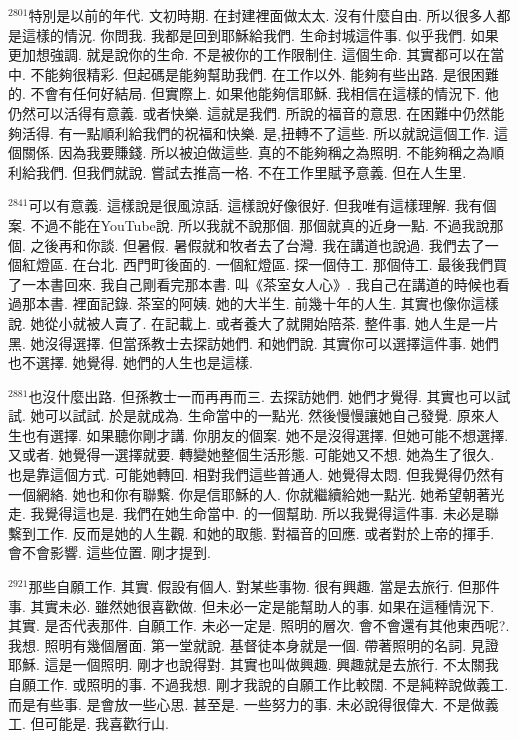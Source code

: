 \documentclass{book}
\begin{document}
$^{2801}$特別是以前的年代.
文初時期.
在封建裡面做太太.
沒有什麼自由.
所以很多人都是這樣的情況.
你問我.
我都是回到耶穌給我們.
生命封城這件事.
似乎我們.
如果更加想強調.
就是說你的生命.
不是被你的工作限制住.
這個生命.
其實都可以在當中.
不能夠很精彩.
但起碼是能夠幫助我們.
在工作以外.
能夠有些出路.
是很困難的.
不會有任何好結局.
但實際上.
如果他能夠信耶穌.
我相信在這樣的情況下.
他仍然可以活得有意義.
或者快樂.
這就是我們.
所說的福音的意思.
在困難中仍然能夠活得.
有一點順利給我們的祝福和快樂.
是,扭轉不了這些.
所以就說這個工作.
這個關係.
因為我要賺錢.
所以被迫做這些.
真的不能夠稱之為照明.
不能夠稱之為順利給我們.
但我們就說.
嘗試去推高一格.
不在工作里賦予意義.
但在人生里.

$^{2841}$可以有意義.
這樣說是很風涼話.
這樣說好像很好.
但我唯有這樣理解.
我有個案.
不過不能在YouTube說.
所以我就不說那個.
那個就真的近身一點.
不過我說那個.
之後再和你談.
但暑假.
暑假就和牧者去了台灣.
我在講道也說過.
我們去了一個紅燈區.
在台北.
西門町後面的.
一個紅燈區.
探一個侍工.
那個侍工.
最後我們買了一本書回來.
我自己剛看完那本書.
叫《茶室女人心》.
我自己在講道的時候也看過那本書.
裡面記錄.
茶室的阿姨.
她的大半生.
前幾十年的人生.
其實也像你這樣說.
她從小就被人賣了.
在記載上.
或者養大了就開始陪茶.
整件事.
她人生是一片黑.
她沒得選擇.
但當孫教士去探訪她們.
和她們說.
其實你可以選擇這件事.
她們也不選擇.
她覺得.
她們的人生也是這樣.

$^{2881}$也沒什麼出路.
但孫教士一而再再而三.
去探訪她們.
她們才覺得.
其實也可以試試.
她可以試試.
於是就成為.
生命當中的一點光.
然後慢慢讓她自己發覺.
原來人生也有選擇.
如果聽你剛才講.
你朋友的個案.
她不是沒得選擇.
但她可能不想選擇.
又或者.
她覺得一選擇就要.
轉變她整個生活形態.
可能她又不想.
她為生了很久.
也是靠這個方式.
可能她轉回.
相對我們這些普通人.
她覺得太悶.
但我覺得仍然有一個網絡.
她也和你有聯繫.
你是信耶穌的人.
你就繼續給她一點光.
她希望朝著光走.
我覺得這也是.
我們在她生命當中.
的一個幫助.
所以我覺得這件事.
未必是聯繫到工作.
反而是她的人生觀.
和她的取態.
對福音的回應.
或者對於上帝的揮手.
會不會影響.
這些位置.
剛才提到.

$^{2921}$那些自願工作.
其實.
假設有個人.
對某些事物.
很有興趣.
當是去旅行.
但那件事.
其實未必.
雖然她很喜歡做.
但未必一定是能幫助人的事.
如果在這種情況下.
其實.
是否代表那件.
自願工作.
未必一定是.
照明的層次.
會不會還有其他東西呢?.
我想.
照明有幾個層面.
第一堂就說.
基督徒本身就是一個.
帶著照明的名詞.
見證耶穌.
這是一個照明.
剛才也說得對.
其實也叫做興趣.
興趣就是去旅行.
不太關我自願工作.
或照明的事.
不過我想.
剛才我說的自願工作比較闊.
不是純粹說做義工.
而是有些事.
是會放一些心思.
甚至是.
一些努力的事.
未必說得很偉大.
不是做義工.
但可能是.
我喜歡行山.
\end{document}
